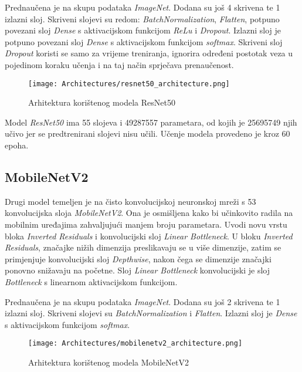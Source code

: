 \documentclass[conference, utf8]{IEEEtran}
\begin{document}
	Prednaučena je na skupu podataka \textit{ImageNet}. Dodana su još 4 skrivena te 1 izlazni sloj. Skriveni slojevi su redom: \textit{BatchNormalization}, \textit{Flatten}, potpuno povezani sloj \textit{Dense} s aktivacijskom funkcijom \textit{ReLu} i \textit{Dropout}. Izlazni sloj je potpuno povezani sloj \textit{Dense} s aktivacijskom funkcijom \textit{softmax}. Skriveni sloj \textit{Dropout} koristi se samo za vrijeme treniranja, ignorira određeni postotak veza u pojedinom koraku učenja i na taj način sprječava prenaučenost.

 	\begin{figure}[H]
		\centering
		\texttt{[image: Architectures/resnet50\_architecture.png]}
		\caption{Arhitektura korištenog modela ResNet50}
		\label{fig:resnet50model}
	\end{figure}
	
		
	Model \textit{ResNet50} ima 55 slojeva i 49287557 parametara, od kojih je 25695749 njih učivo jer se predtrenirani slojevi nisu učili. Učenje modela provedeno je kroz 60 epoha.
	
	
	\subsection{MobileNetV2}
	Drugi model temeljen je na čisto konvolucijskoj neuronskoj mreži s 53 konvolucijska sloja \textit{MobileNetV2}. Ona je osmišljena kako bi učinkovito radila na mobilnim uređajima zahvaljujući manjem broju parametara. Uvodi novu vrstu bloka \textit{Inverted Residuals} i konvolucijski sloj \textit{Linear Bottleneck}. U bloku \textit{Inverted Residuals}, značajke nižih dimenzija preslikavaju se u više dimenzije, zatim se primjenjuje konvolucijski sloj \textit{Depthwise}, nakon čega se dimenzije značajki ponovno snižavaju na početne. Sloj \textit{Linear Bottleneck} konvolucijski je sloj \textit{Bottleneck} s linearnom aktivacijskom funkcijom.
	
	Prednaučena je na skupu podataka \textit{ImageNet}. Dodana su još 2 skrivena te 1 izlazni sloj. Skriveni slojevi su \textit{BatchNormalization} i \textit{Flatten}. Izlazni sloj je \textit{Dense} s aktivacijskom funkcijom \textit{softmax}.
	
	\begin{figure}[H]
		\centering
		\texttt{[image: Architectures/mobilenetv2\_architecture.png]}
		\caption{Arhitektura korištenog modela MobileNetV2}
		\label{fig:mobilenetv2model}
	\end{figure}
	
\end{document}
